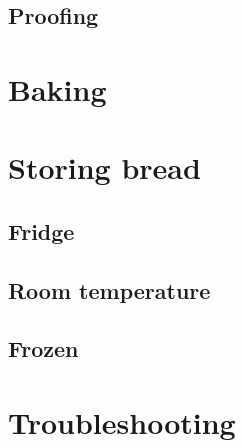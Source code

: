 \documentclass[a4paper, 12pt]{book}
\begin{document}
\section{Proofing}

\chapter{Baking}


\chapter{Storing bread}
\section{Fridge}
\section{Room temperature}
\section{Frozen}

\chapter{Troubleshooting}




\printbibliography
\end{document}
